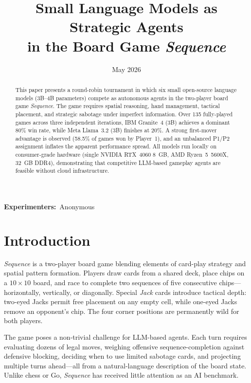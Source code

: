 \documentclass[11pt]{article}
\title{\bfseries Small Language Models as Strategic Agents\\in the Board Game \textit{Sequence}}
\author{}
\date{May 2026}
\begin{document}
\maketitle

\begin{center}
\small
\textbf{Experimenters:}~Anonymous
\end{center}
\vspace{6pt}

\begin{abstract}
This paper presents a round-robin tournament in which six small open-source language models (3B--4B parameters) compete as autonomous agents in the two-player board game \textit{Sequence}. The game requires spatial reasoning, hand management, tactical placement, and strategic sabotage under imperfect information. Over 135 fully-played games across three independent iterations, IBM Granite~4 (3B) achieves a dominant 80\% win rate, while Meta Llama~3.2 (3B) finishes at 20\%. A strong first-mover advantage is observed (58.5\% of games won by Player~1), and an unbalanced P1/P2 assignment inflates the apparent performance spread. All models run locally on consumer-grade hardware (single NVIDIA RTX~4060 8~GB, AMD Ryzen~5~5600X, 32~GB DDR4), demonstrating that competitive LLM-based gameplay agents are feasible without cloud infrastructure.
\end{abstract}

\section{Introduction}

\textit{Sequence} is a two-player board game blending elements of card-play strategy and spatial pattern formation. Players draw cards from a shared deck, place chips on a $10 \times 10$ board, and race to complete two sequences of five consecutive chips---horizontally, vertically, or diagonally. Special \textit{Jack} cards introduce tactical depth: two-eyed Jacks permit free placement on any empty cell, while one-eyed Jacks remove an opponent's chip. The four corner positions are permanently wild for both players.

The game poses a non-trivial challenge for LLM-based agents. Each turn requires evaluating dozens of legal moves, weighing offensive sequence-completion against defensive blocking, deciding when to use limited sabotage cards, and projecting multiple turns ahead---all from a natural-language description of the board state. Unlike chess or Go, \textit{Sequence} has received little attention as an AI benchmark.
\end{document}
